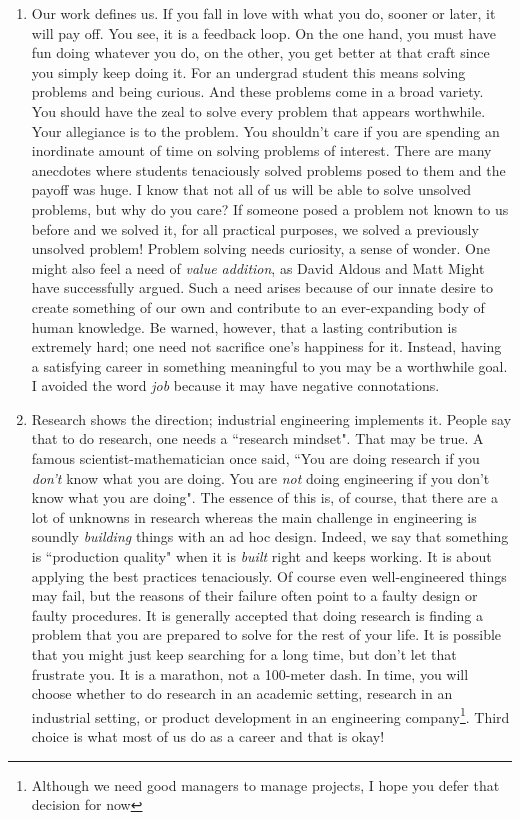 \documentclass[a6paper]{article}
\begin{document}
\begin{enumerate}
    \item Our work defines us. If you fall in love with what you do, sooner or later, it will pay off. You see, it is a feedback loop. On the one hand, you must have fun doing whatever you do, on the other, you get better at that craft since you simply keep doing it. For an undergrad student this means solving problems and being curious. And these problems come in a broad variety. You should have the zeal to solve every problem that appears worthwhile. Your allegiance is to the problem. You shouldn't care if you are spending an inordinate amount of time on solving problems of interest. There are many anecdotes where students tenaciously solved problems posed to them and the payoff was huge. I know that not all of us will be able to solve unsolved problems, but why do you care? If someone posed a problem not known to us before and we solved it, for all practical purposes, we solved a previously unsolved problem! Problem solving needs curiosity, a sense of wonder. One might also feel a need of \emph{value addition}, as David Aldous \cite{david} and Matt Might \cite{matt} have successfully argued. Such a need arises because of our innate desire to create something of our own and contribute to an ever-expanding body of human knowledge. Be warned, however, that a lasting contribution is extremely hard; one need not sacrifice one's happiness for it. Instead, having a satisfying career in something meaningful to you may be a worthwhile goal. I avoided the word \emph{job} because it may have negative connotations.
    \item Research shows the direction; industrial engineering implements it. People say that to do research, one needs a ``research mindset". That may be true. A famous scientist-mathematician \cite{hamming} once said, ``You are doing research if you \emph{don't} know what you are doing. You are \emph{not} doing engineering if you don't know what you are doing". The essence of this is, of course, that there are a lot of unknowns in research whereas the main challenge in engineering is soundly \emph{building} things with an ad hoc design. Indeed, we say that something is ``production quality" when it is \emph{built} right and keeps working. It is about applying the best practices tenaciously. Of course even well-engineered things may fail, but the reasons of their failure often point to a faulty design or faulty procedures.  It is generally accepted that doing research is finding a problem that you are prepared to solve for the rest of your life. It is possible that you might just keep searching for a long time, but don't let that frustrate you. It is a marathon, not a 100-meter dash. In time, you will choose whether to do research in an academic setting, research in an industrial setting, or product development in an engineering company\footnote{Although we need good managers to manage projects, I hope you defer that decision for now}. Third choice is what most of us do as a career and that is okay!

\end{enumerate}
\end{document}
